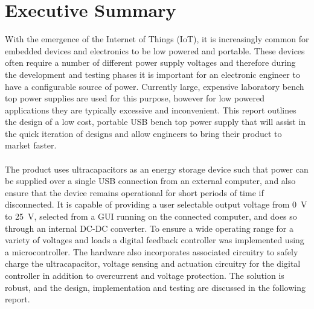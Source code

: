 \section*{Executive Summary}
With the emergence of the Internet of Things (IoT), it is increasingly common for embedded devices and electronics to be low powered and portable. These devices often require a number of different power supply voltages and therefore during the development and testing phases it is important for an electronic engineer to have a configurable source of power. Currently large, expensive laboratory bench top power supplies are used for this purpose, however for low powered applications they are typically excessive and inconvenient. This report outlines the design of a low cost, portable USB bench top power supply that will assist in the quick iteration of designs and allow engineers to bring their product to market faster.
\\ \\
The product uses ultracapacitors as an energy storage device such that power can be supplied over a single USB connection from an external computer, and also ensure that the device remains operational for short periods of time if disconnected. It is capable of providing a user selectable output voltage from \SI{0}{V} to \SI{25}{V}, selected from a GUI running on the connected computer, and does so through an internal DC-DC converter. To ensure a wide operating range for a variety of voltages and loads a digital feedback controller was implemented using a microcontroller. The hardware also incorporates associated circuitry to safely charge the ultracapacitor, voltage sensing and actuation circuitry for the digital controller in addition to overcurrent and voltage protection. The solution is robust, and the design, implementation and testing are discussed in the following report.


